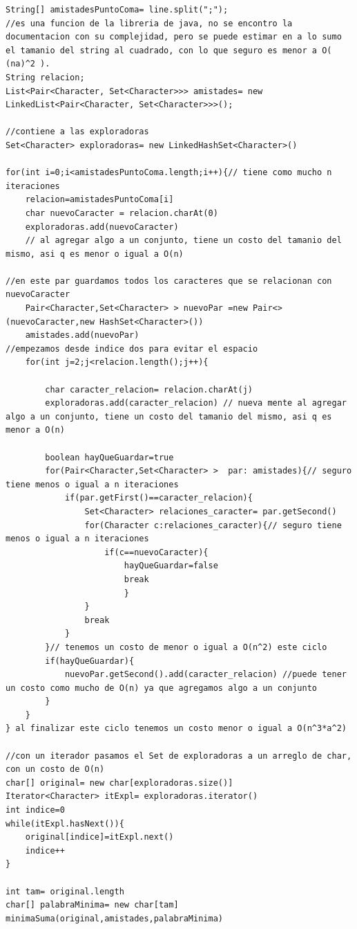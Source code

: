 \begin{lstlisting}
String[] amistadesPuntoComa= line.split(";"); 
//es una funcion de la libreria	de java, no se encontro la documentacion con su complejidad, pero se puede estimar en a lo sumo el tamanio del string al cuadrado, con lo que seguro es menor a O( (na)^2 ).
String relacion;
List<Pair<Character, Set<Character>>> amistades= new LinkedList<Pair<Character, Set<Character>>>();
				
//contiene a las exploradoras
Set<Character> exploradoras= new LinkedHashSet<Character>()
				
for(int i=0;i<amistadesPuntoComa.length;i++){// tiene como mucho n iteraciones
	relacion=amistadesPuntoComa[i]
	char nuevoCaracter = relacion.charAt(0)
	exploradoras.add(nuevoCaracter)
	// al agregar algo a un conjunto, tiene un costo del tamanio del mismo, asi q es menor o igual a O(n)
					
//en este par guardamos todos los caracteres que se relacionan con nuevoCaracter
	Pair<Character,Set<Character> > nuevoPar =new Pair<>(nuevoCaracter,new HashSet<Character>())
	amistades.add(nuevoPar)
//empezamos desde indice dos para evitar el espacio
	for(int j=2;j<relacion.length();j++){
						
		char caracter_relacion= relacion.charAt(j)
		exploradoras.add(caracter_relacion) // nueva mente al agregar algo a un conjunto, tiene un costo del tamanio del mismo, asi q es menor a O(n)
								
		boolean hayQueGuardar=true
		for(Pair<Character,Set<Character> >  par: amistades){// seguro tiene menos o igual a n iteraciones		
			if(par.getFirst()==caracter_relacion){
				Set<Character> relaciones_caracter= par.getSecond()						
				for(Character c:relaciones_caracter){// seguro tiene menos o igual a n iteraciones							
					if(c==nuevoCaracter){
						hayQueGuardar=false
						break
						}
				}				
				break
			}					
		}// tenemos un costo de menor o igual a O(n^2) este ciclo
		if(hayQueGuardar){
			nuevoPar.getSecond().add(caracter_relacion) //puede tener un costo como mucho de O(n) ya que agregamos algo a un conjunto
		}
	}
} al finalizar este ciclo tenemos un costo menor o igual a O(n^3*a^2)

//con un iterador pasamos el Set de exploradoras a un arreglo de char, con un costo de O(n)
char[] original= new char[exploradoras.size()]
Iterator<Character> itExpl= exploradoras.iterator()
int indice=0
while(itExpl.hasNext()){
	original[indice]=itExpl.next()					
	indice++
}
					
int tam= original.length
char[] palabraMinima= new char[tam]	
minimaSuma(original,amistades,palabraMinima)
\end{lstlisting}

